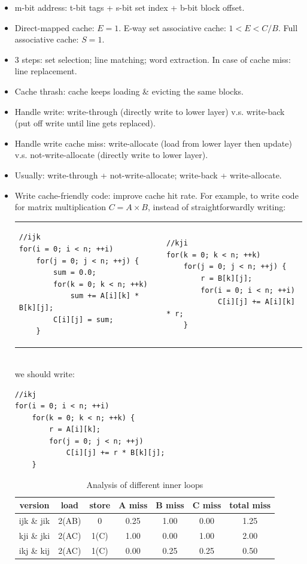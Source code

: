 \begin{itemize}
\item m-bit address: t-bit tags + s-bit set index + b-bit block offset.
\item Direct-mapped cache: $E = 1$. E-way set associative cache: $1<E<C/B$. Full associative cache: $S=1$.
\item 3 steps: set selection; line matching; word extraction. In case of cache miss: line replacement.
\item Cache thrash: cache keeps loading \& evicting the same blocks.
\item Handle write: write-through (directly write to lower layer) v.s. write-back (put off write until line gets replaced).
\item Handle write cache miss: write-allocate (load from lower layer then update) v.s. not-write-allocate (directly write to lower layer).
\item Usually: write-through + not-write-allocate; write-back + write-allocate.
\item Write cache-friendly code: improve cache hit rate. For example, to write code for matrix multiplication $C=A\times B$, instead of straightforwardly writing:\\
\begin{tabular}{m{180pt}m{180pt}}
\begin{lstlisting}
//ijk
for(i = 0; i < n; ++i)
	for(j = 0; j < n; ++j) {
		sum = 0.0;
		for(k = 0; k < n; ++k)
			sum += A[i][k] * B[k][j];
		C[i][j] = sum;
	}
\end{lstlisting}
&
\begin{lstlisting}
//kji
for(k = 0; k < n; ++k)
	for(j = 0; j < n; ++j) {
		r = B[k][j];
		for(i = 0; i < n; ++i)
			C[i][j] += A[i][k] * r;
	}

\end{lstlisting}\\
\end{tabular}\\
we should write:
\begin{lstlisting}
//ikj
for(i = 0; i < n; ++i)
	for(k = 0; k < n; ++k) {
		r = A[i][k];
		for(j = 0; j < n; ++j)
			C[i][j] += r * B[k][j];
	}
\end{lstlisting}
\begin{table}[ht]
\caption{Analysis of different inner loops}
\centering
\begin{tabular}{c|c|c|c|c|c|c}\toprule
version & load & store & A miss & B miss & C miss & total miss\\\midrule
ijk \& jik & 2(AB) & 0 		& 0.25 & 1.00 & 0.00 & 1.25\\\midrule
kji \& jki & 2(AC) & 1(C) & 1.00 & 0.00 & 1.00 & 2.00\\\midrule
ikj \& kij & 2(AC) & 1(C) & 0.00 & 0.25 & 0.25 & 0.50\\\bottomrule
\end{tabular}
\end{table}

\end{itemize}
\ifx\PREAMBLE\undefined

\fi